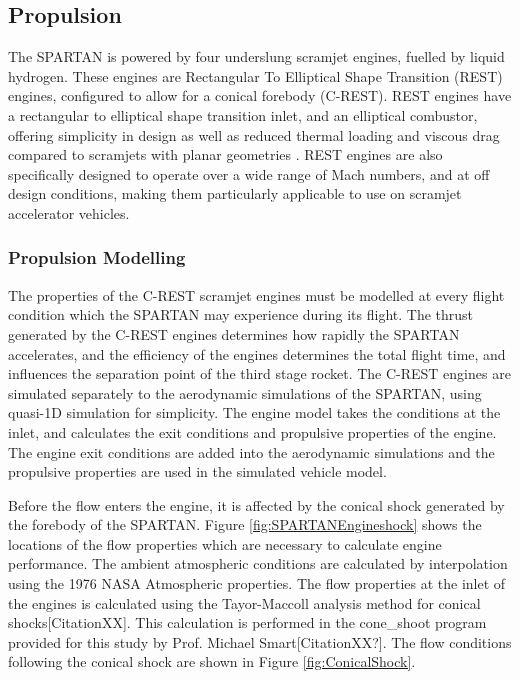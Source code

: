 		


\subsection{Propulsion}


The SPARTAN is powered by four underslung scramjet engines, fuelled by liquid hydrogen. These engines are Rectangular To Elliptical Shape Transition (REST) engines, configured to allow for a conical forebody (C-REST). REST engines have a rectangular to elliptical shape transition inlet, and an elliptical combustor, offering simplicity in design as well as reduced thermal loading and viscous drag compared to scramjets with planar geometries \cite{Suraweera2009}.  REST engines are also specifically designed to operate over a wide range of Mach numbers, and at off design conditions, making them particularly applicable to use on scramjet accelerator vehicles. 


\subsubsection{Propulsion Modelling}\label{sec:Propulsion}

The properties of the C-REST scramjet engines must be modelled at every flight condition which the SPARTAN may experience during its flight. The thrust generated by the C-REST engines determines how rapidly the SPARTAN accelerates, and the efficiency of the engines determines the total flight time, and influences the separation point of the third stage rocket. The C-REST engines are simulated separately to the aerodynamic simulations of the SPARTAN, using quasi-1D simulation for simplicity\cite{Preller2017,Preller2018}. The engine model takes the conditions at the inlet, and calculates the exit conditions and propulsive properties of the engine. The engine exit conditions are added into the aerodynamic simulations and the propulsive properties are used in the simulated vehicle model.

Before the flow enters the engine, it is affected by the conical shock generated by the forebody of the SPARTAN.
Figure \ref{fig:SPARTANEngineshock} shows the locations of the flow properties which are necessary to calculate engine performance. The ambient atmospheric conditions are calculated by interpolation using the 1976 NASA Atmospheric properties\cite{Administration1976}.
The flow properties at the inlet of the engines is calculated using the Tayor-Maccoll analysis method for conical shocks[CitationXX]. This calculation is performed in the cone\_shoot program provided for this study by Prof. Michael Smart[CitationXX?]. The flow conditions following the conical shock are shown in Figure \ref{fig:ConicalShock}.  

